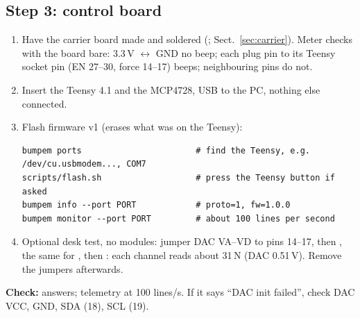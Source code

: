 \subsection{Step 3: control board}
\begin{enumerate}
\item Have the carrier board made and soldered (; Sect.~\ref{sec:carrier}).
Meter checks with the board bare: 3.3\,V $\leftrightarrow$ GND no beep; each plug pin to its Teensy socket pin
(EN 27--30, force 14--17) beeps; neighbouring pins do not.
\item Insert the Teensy 4.1 and the MCP4728, USB to the PC, nothing else connected.
\item Flash firmware v1 (erases what was on the Teensy):
\begin{lstlisting}
bumpem ports                       # find the Teensy, e.g. /dev/cu.usbmodem..., COM7
scripts/flash.sh                   # press the Teensy button if asked
bumpem info --port PORT            # proto=1, fw=1.0.0
bumpem monitor --port PORT         # about 100 lines per second
\end{lstlisting}
\item Optional desk test, no modules: jumper DAC VA--VD to pins 14--17, then
, the same for , then :
each channel reads about 31\,N (DAC 0.51\,V). Remove the jumpers afterwards.
\end{enumerate}
\textbf{Check:}  answers; telemetry at 100 lines/s. If it says ``DAC init failed'', check
DAC VCC, GND, SDA (18), SCL (19).

